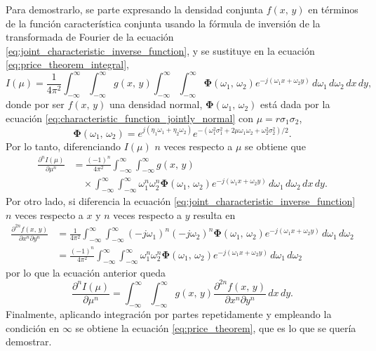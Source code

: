 \documentclass[a4paper]{report}
\newcommand{\Phibf}{\mathbf{\Phi}}
\begin{document}
Para demostrarlo, se parte expresando la densidad conjunta \(f(x,\,y)\) en términos de la función característica conjunta usando la fórmula de inversión de la transformada de Fourier de la ecuación \ref{eq:joint_characteristic_inverse_function}, y se sustituye en la ecuación \ref{eq:price_theorem_integral},
\[
 I(\mu)=\frac{1}{4\pi^2}\int_{-\infty}^{\infty}\int_{-\infty}^{\infty}g(x,\,y)\int_{-\infty}^{\infty}\int_{-\infty}^{\infty}\Phibf(\omega_1,\,\omega_2)e^{-j(\omega_1x+\omega_2y)}\,d\omega_1\,d\omega_2\,dx\,dy,
\]
donde por ser \(f(x,\,y)\) una densidad normal, \(\Phibf(\omega_1,\,\omega_2)\) está dada por la ecuación \ref{eq:characteristic_function_jointly_normal} con \(\mu=r\sigma_1\sigma_2\),
\[
 \Phibf(\omega_1,\,\omega_2)=e^{j(\eta_1\omega_1+\eta_2\omega_2)}e^{-(\omega_1^2\sigma_1^2+2\mu\omega_1\omega_2+\omega_2^2\sigma_2^2)/2}.
\]
Por lo tanto, diferenciando \(I(\mu)\) \(n\) veces respecto a \(\mu\) se obtiene que
\begin{align*}
 \frac{\partial^n I(\mu)}{\partial \mu^n}&=\frac{(-1)^n}{4\pi^2}\int_{-\infty}^{\infty}\int_{-\infty}^{\infty}g(x,\,y)\\
 &\quad\times\int_{-\infty}^{\infty}\int_{-\infty}^{\infty}\omega_1^n\omega_2^n\Phibf(\omega_1,\,\omega_2)e^{-j(\omega_1x+\omega_2y)}\,d\omega_1\,d\omega_2\,dx\,dy.
\end{align*}
Por otro lado, si diferencia la ecuación \ref{eq:joint_characteristic_inverse_function} \(n\) veces respecto a \(x\) y \(n\) veces respecto a \(y\) resulta en
\begin{align*}
 \frac{\partial^{2n}f(x,\,y)}{\partial x^n\partial y^n}&=\frac{1}{4\pi^2}\int_{-\infty}^{\infty}\int_{-\infty}^{\infty}(-j\omega_1)^n(-j\omega_2)^n\Phibf(\omega_1,\,\omega_2)e^{-j(\omega_1x+\omega_2y)}\,d\omega_1\,d\omega_2\\
 &=\frac{(-1)^n}{4\pi^2}\int_{-\infty}^{\infty}\int_{-\infty}^{\infty}\omega_1^n\omega_2^n\Phibf(\omega_1,\,\omega_2)e^{-j(\omega_1x+\omega_2y)}\,d\omega_1\,d\omega_2
\end{align*}
por lo que la ecuación anterior queda
\[
 \frac{\partial^n I(\mu)}{\partial \mu^n}=\int_{-\infty}^{\infty}\int_{-\infty}^{\infty}g(x,\,y)
 \frac{\partial^{2n}f(x,\,y)}{\partial x^n\partial y^n}\,dx\,dy.
\]
Finalmente, aplicando integración por partes repetidamente y empleando la condición en \(\infty\) se obtiene la ecuación \ref{eq:price_theorem}, que es lo que se quería demostrar. 
\end{document}
